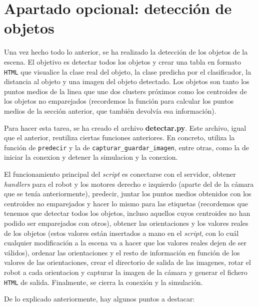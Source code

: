 \documentclass[11pt,a4paper]{article}
\begin{document}
\section{Apartado opcional: detección de objetos}

Una vez hecho todo lo anterior, se ha realizado la detección de los objetos de
la escena. El objetivo es detectar todos los objetos y crear una tabla en formato
\texttt{HTML} que visualice la clase real del objeto, la clase predicha por
el clasificador, la distancia al objeto y una imagen del objeto detectado.
Los objetos son tanto los puntos medios de la linea que une dos clusters próximos
como los centroides de los objetos no emparejados (recordemos la función para calcular
los puntos medios de la sección anterior, que también devolvía esa información).

Para hacer esta tarea, se ha creado el archivo \textbf{detectar.py}. Este archivo, igual
que el anterior, reutiliza ciertas funciones anteriores. En concreto, utiliza la función de
\texttt{predecir} y la de \texttt{capturar\_guardar\_imagen}, entre otras, como la de
iniciar la conexion y detener la simulacion y la conexion.

El funcionamiento principal del \textit{script} es conectarse con el servidor, obtener
\textit{handlers} para el robot y los motores derecho e izquierdo (aparte del de la
cámara que se tenía anteriormente), predecir, juntar los puntos medios obtenidos con los
centroides no emparejados y hacer lo mismo para las etiquetas (recordemos que tenemos que
detectar todos los objetos, incluso aquellos cuyos centroides no han podido ser emparejados con
otros), obtener las orientaciones
y los valores reales de los objetos (estos valores están insertados a mano en el \textit{script},
con lo cuál cualquier modificación a la escena va a hacer que los valores reales dejen de
ser válidos), ordenar las orientaciones y el resto de información en función de los
valores de las orientaciones, crear el directorio de salida de las imagenes, rotar
el robot a cada orientacion y capturar la imagen de la cámara y generar el fichero \texttt{HTML}
de salida. Finalmente, se cierra la conexión y la simulación.

De lo explicado anteriormente, hay algunos puntos a destacar:
\end{document}
